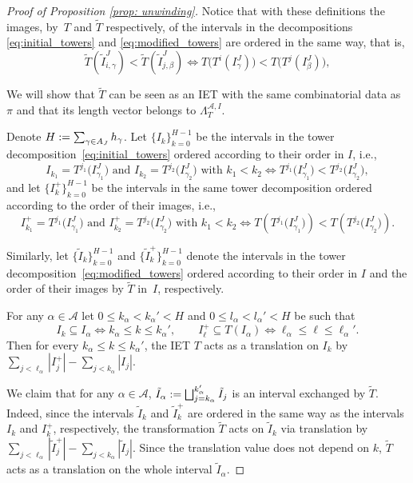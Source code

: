 \documentclass[JEP,XML,SOM,Unicode,NoEqCountersInSection,NoFloatCountersInSection,published]{cedram}
\let\oldbigsqcup\bigsqcup
\renewcommand{\bigsqcup}{\mathop{\textstyle\oldbigsqcup}\displaylimits}
\theoremstyle{plain}
\theoremstyle{definition}
\newcommand{\A}{\mathcal{A}}
\begin{document}
\begin{proof}[Proof of Proposition \ref{prop: unwinding}]
Notice that with these definitions the images, by~$T$ and $\tilde T$ respectively, of the intervals in the decompositions \eqref{eq:initial_towers} and \eqref{eq:modified_towers} are ordered in the same way, that is,
\[
 \tilde T(\tilde I_{i, \gamma}^J) < \tilde T(\tilde I_{j, \beta}^J ) \iff T \big( T^i(I_\gamma^J)\big) < T \big( T^j(I_\beta^J) \big),
\]

We will show that $\tilde T$ can be seen as an IET with the same combinatorial data as~$\pi$ and that its length vector belongs to $\Lambda^{\A, I}_T$.

Denote $H:= \sum_{\gamma\in\mathcal \A_J}h_{\gamma}$. Let $\{I_k\}_{k = 0}^{H - 1}$ be the intervals in the tower decomposition~\eqref{eq:initial_towers} ordered according to their order in $I$, i.e.,
\[
I_{k_1}=T^{j_1}\big(I_{\gamma_1}^J\big)\text{ and }I_{k_2}=T^{j_2}\big(I_{\gamma_2}^J\big)\text{ with }k_1<k_2\iff T^{j_1}\big(I_{\gamma_1}^J\big)<T^{j_2}\big(I_{\gamma_2}^J\big),
\]
and let $\{I_k^+\}_{k = 0}^{H - 1}$ be the intervals in the same tower decomposition ordered according to the order of their images, i.e.,
\[
I_{k_1}^+=T^{j_1}\big(I_{\gamma_1}^J\big)\text{ and }I_{k_2}^+=T^{j_2}\big(I_{\gamma_2}^J\big)\text{ with }k_1<k_2\iff T\left(T^{j_1}\big(I_{\gamma_1}^J\big)\right)<T\left(T^{j_2}\big(I_{\gamma_2}^J\big)\right).
\]

Similarly, let $\{\tilde I_k\}_{k = 0}^{H - 1}$ and $\{\tilde I_k^+\}_{k = 0}^{H - 1}$ denote the intervals in the tower decomposition~\eqref{eq:modified_towers} ordered according to their order in $I$ and the order of their images by $\tilde T$ in~$I$, respectively.

For any $\alpha \in \A$ let $0\le k_\alpha< k_{\alpha}' < H$ and $0\le l_\alpha< l_{\alpha}' < H$ be such that
\[
I_{k}\subseteq I_{\alpha}\iff k_{\alpha}\le k\le k_{\alpha}', \qquad I_{\ell}^+\subseteq T(I_{\alpha})\iff \ell_{\alpha}\le \ell\le \ell_{\alpha}'.
\]
Then for every $k_{\alpha}\le k\le k_{\alpha}'$, the IET $T$ acts as a translation on $I_{k}$ by $\sum_{j<\ell_\alpha}|I_j^+|-\sum_{j<k_\alpha}|I_j|$.

We claim that for any $\alpha \in \A$, $\tilde I_{\alpha}:=\bigsqcup_{j=k_\alpha}^{k_\alpha'}\tilde I_j$ is an interval exchanged by $\tilde T$.
Indeed, since the intervals $\tilde I_k$ and $\tilde I_k^+$ are ordered in the same way as the intervals $I_k$ and $I_k^+$, respectively, the transformation $\tilde{T}$ acts on $\tilde I_k$ via translation by $\sum_{j<\ell_\alpha}|\tilde I_j^+|-\sum_{j<k_\alpha}|\tilde I_j|$. Since the translation value does not depend on $k$, $\tilde{T}$ acts as a translation on the whole interval $\tilde I_{\alpha}$.


\end{proof}
\end{document}
